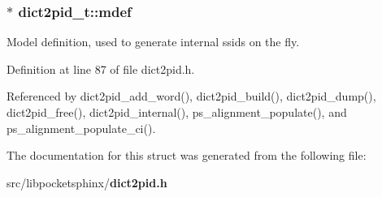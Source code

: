 \subsubsection[{mdef}]{$\ast$ dict2pid\+\_\+t\+::mdef}\label{structdict2pid__t_ab0dcb283a0cf5ad40836bc418fd535b3}


Model definition, used to generate internal ssids on the fly. 



Definition at line 87 of file dict2pid.\+h.



Referenced by dict2pid\+\_\+add\+\_\+word(), dict2pid\+\_\+build(), dict2pid\+\_\+dump(), dict2pid\+\_\+free(), dict2pid\+\_\+internal(), ps\+\_\+alignment\+\_\+populate(), and ps\+\_\+alignment\+\_\+populate\+\_\+ci().



The documentation for this struct was generated from the following file\+:\begin{DoxyCompactItemize}
\item 
src/libpocketsphinx/{\bf dict2pid.\+h}\end{DoxyCompactItemize}
